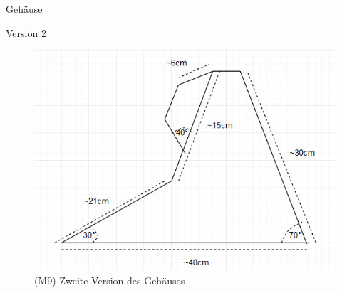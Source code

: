 \documentclass[mathserif,9pt]{article}
\begin{document}
    \begin{frame}{Gehäuse}
        \begin{block}{Version 2}
            \begin{figure}
                \centering
                \includegraphics[height=0.5\paperheight]{img/gehause-version2.jpeg}
                \caption[M9]{(M9) Zweite Version des Geh\"auses}
                \label{fig:gehausev2}
            \end{figure}
        \end{block}
    \end{frame}
\end{document}
